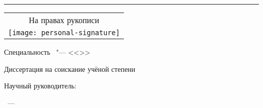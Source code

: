 

\thispagestyle{empty}
\begin{center}
	\thesisFirstOrganization
		
	\ifdefined\thesisSecondOrganization
		\thesisSecondOrganization
	\fi
		
	\rule{\linewidth}{1pt}
\end{center}


\vspace{0pt plus4fill} 
\begin{flushright}
	\begin{tabular}{@{}c@{}}
		На правах рукописи \\
		\texttt{[image: personal-signature]}
	\end{tabular}
\end{flushright}


\vspace{0pt plus2fill} 
\begin{center}
	{\large \thesisAuthor}
\end{center}


\vspace{0pt plus1fill} 
\begin{center}
	\textbf {\large \MakeUppercase \thesisTitle}
	
	\vspace{0pt plus2fill} 
	Специальность \thesisSpecialtyNumber\ "--- <<\thesisSpecialtyTitle>>
	
	\vspace{0pt plus2fill} 
	Диссертация на соискание учёной степени
	
	\thesisDegree
\end{center}


\vspace{0pt plus4fill} 
\begin{flushright}
	Научный руководитель:

	\supervisorRegalia

	\ifdefined\supervisorDead
		\framebox{\supervisorFio}
	\else
		\supervisorFio
	\fi
\end{flushright}


\vspace{0pt plus4fill} 
{\centering\thesisCity~---~\thesisYear\par}
